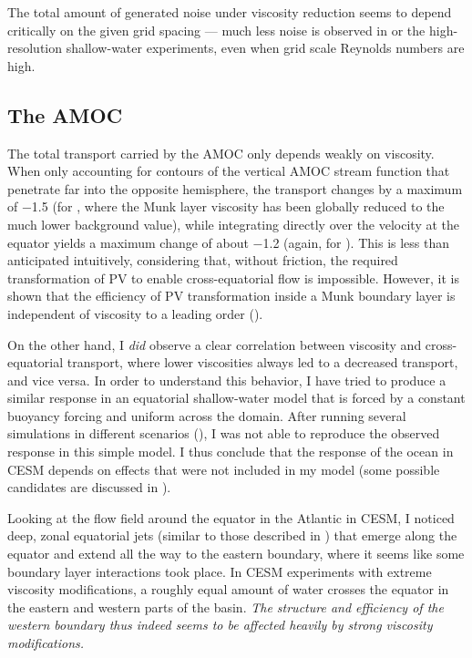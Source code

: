 The total amount of generated noise under viscosity reduction seems to depend critically on the given grid spacing --- much less noise is observed in  or the high-resolution shallow-water experiments, even when grid scale Reynolds numbers are high.

\subsection{The \acl{AMOC}}
\label{sec:outro-amoc}
The total transport carried by the \ac{AMOC} only depends weakly on viscosity. When only accounting for contours of the vertical \ac{AMOC} stream function that penetrate far into the opposite hemisphere, the transport changes by a maximum of \SI{-1.5}{\sv} (for , where the Munk layer viscosity has been globally reduced to the much lower background value), while integrating directly over the velocity at the equator yields a maximum change of about \SI{-1.2}{\sv} (again, for ). This is less than anticipated intuitively, considering that, without friction, the required transformation of \ac{PV} to enable cross-equatorial flow is impossible. However, it is shown that the efficiency of \ac{PV} transformation inside a Munk boundary layer is independent of viscosity to a leading order ().

On the other hand, I \emph{did} observe a clear correlation between viscosity and cross-equatorial transport, where lower viscosities always led to a decreased transport, and vice versa. In order to understand this behavior, I have tried to produce a similar response in an equatorial shallow-water model that is forced by a constant buoyancy forcing and uniform  across the domain. After running several simulations in different scenarios (), I was not able to reproduce the observed response in this simple model. I thus conclude that the response of the ocean in \ac{CESM} depends on effects that were not included in my model (some possible candidates are discussed in ).

Looking at the flow field around the equator in the Atlantic in \ac{CESM}, I noticed deep, zonal equatorial jets (similar to those described in \cite{greatbatch-jets}) that emerge along the equator and extend all the way to the eastern boundary, where it seems like some boundary layer interactions took place. In \ac{CESM} experiments with extreme viscosity modifications, a roughly equal amount of water crosses the equator in the eastern and western parts of the basin. \emph{The structure and efficiency of the western boundary thus indeed seems to be affected heavily by strong viscosity modifications.}

